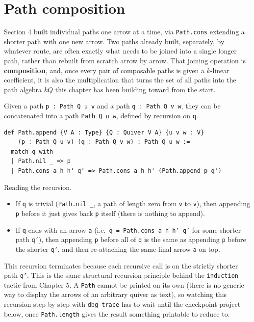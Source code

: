 \section{Path composition}\label{sec:12-path-algebras:05-path-composition:1}

Section 4 built individual paths one arrow at a time, via \texttt{Path.cons} extending a shorter path with one new arrow. Two paths already built, separately, by whatever route, are often exactly what needs to be joined into a single longer path, rather than rebuilt from scratch arrow by arrow. That joining operation is \textbf{composition}, and, once every pair of composable paths is given a \(k\)-linear coefficient, it is also the multiplication that turns the set of all paths into the path algebra \(kQ\) this chapter has been building toward from the start.

Given a path \texttt{p : Path Q u v} and a path \texttt{q : Path Q v w}, they can be concatenated into a path \texttt{Path Q u w}, defined by recursion on \texttt{q}.

\begin{lstlisting}
def Path.append {V A : Type} {Q : Quiver V A} {u v w : V}
    (p : Path Q u v) (q : Path Q v w) : Path Q u w :=
  match q with
  | Path.nil _ => p
  | Path.cons a h h' q' => Path.cons a h h' (Path.append p q')
\end{lstlisting}

Reading the recursion.

\begin{itemize}
\tightlist
\item
  If \texttt{q} is trivial (\texttt{Path.nil \_\allowbreak{}}, a path of length zero from \texttt{v} to \texttt{v}), then appending \texttt{p} before it just gives back \texttt{p} itself (there is nothing to append).
\item
  If \texttt{q} ends with an arrow \texttt{a} (i.e.~\texttt{q = Path.cons a h h' q'} for some shorter path \texttt{q'}), then appending \texttt{p} before all of \texttt{q} is the same as appending \texttt{p} before the shorter \texttt{q'}, and then re-attaching the same final arrow \texttt{a} on top.
\end{itemize}

This recursion terminates because each recursive call is on the strictly shorter path \texttt{q'}. This is the same structural recursion principle behind the \texttt{induction} tactic from Chapter 5. A \texttt{Path} cannot be printed on its own (there is no generic way to display the arrows of an arbitrary quiver as text), so watching this recursion step by step with \texttt{dbg\_\allowbreak{}trace} has to wait until the checkpoint project below, once \texttt{Path.length} gives the result something printable to reduce to.

